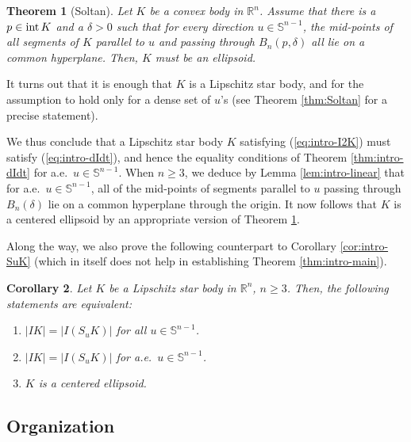 \documentclass[11pt]{article}
\newtheorem{thm}{Theorem}[section]
\newtheorem{cor}[thm]{Corollary}
\theoremstyle{definition}
\theoremstyle{proof}
\DeclareMathOperator{\+}{\mathop{\tilde{+}}}
\DeclareMathOperator{\interior}{\textnormal{int}}
\newcommand{\R}{\mathbb{R}}
\renewcommand{\S}{\mathbb{S}}
\numberwithin{equation}{section}
\numberwithin{equation}{section}
\begin{document}
\begin{thm}[Soltan] \label{thm:intro-Soltan}
Let $K$ be a convex body in $\R^n$. Assume that there is a $p \in \interior K$ and a $\delta > 0$ such that for every direction $u \in \S^{n-1}$, the mid-points of all segments of $K$ parallel to $u$ and passing through $B_n(p,\delta)$ all lie on a common hyperplane. Then, $K$ must be an ellipsoid. 
\end{thm}
\noindent It turns out that it is enough that $K$ is a Lipschitz star body, and for the assumption to hold only for a dense 
set of $u$'s (see Theorem \ref{thm:Soltan} for a precise statement). 

\medskip

We thus conclude that a Lipschitz star body $K$ satisfying (\ref{eq:intro-I2K}) must satisfy (\ref{eq:intro-dIdt}), and hence the equality conditions of Theorem \ref{thm:intro-dIdt} for a.e.~$u \in \S^{n-1}$.
When $n \geq 3$, we deduce by Lemma \ref{lem:intro-linear} that for a.e.~$u \in \S^{n-1}$, all of the mid-points of segments parallel to $u$ passing through $B_n(\delta)$ lie on a common hyperplane through the origin. It now follows that $K$ is a centered ellipsoid by an appropriate version of Theorem \ref{thm:intro-Soltan}. 

\smallskip
Along the way, we also prove the following counterpart to Corollary \ref{cor:intro-SuK} (which in itself does not help in establishing Theorem \ref{thm:intro-main}).

\begin{cor} \label{cor:intro-SuK-equality}
Let $K$ be a Lipschitz star body in $\R^n$, $n \geq 3$. Then, the following statements are equivalent:
\begin{enumerate}
\item $|I K| = |I(S_u K)|$ for all $u \in \S^{n-1}$. 
\item $|I K| = |I(S_u K)|$ for a.e.~$u \in \S^{n-1}$. 
\item $K$ is a centered ellipsoid. 
\end{enumerate}
\end{cor}



\subsection{Organization}
\end{document}
